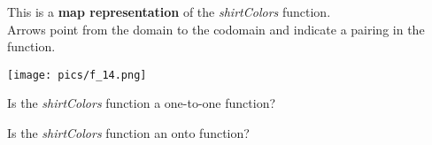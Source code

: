 \documentclass{ximera}
\begin{document}
\begin{exercise}


This is a \textbf{map representation} of the \textit{shirtColors} function. \\

Arrows point from the domain to the codomain and indicate a pairing in the function.

\begin{image}
\texttt{[image: pics/f\_14.png]}
\end{image}


\begin{question}
Is the \textit{shirtColors} function a one-to-one function?

\begin{multipleChoice}
\end{multipleChoice}
\end{question}






\begin{question}
Is the \textit{shirtColors} function an onto function?

\begin{multipleChoice}
\end{multipleChoice}
\end{question}


\end{exercise}
\end{document}

